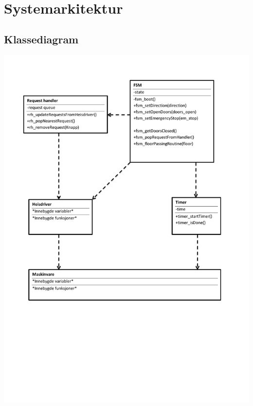 \documentclass[10pt,a4paper]{article}
\begin{document}
\section{Systemarkitektur}
\subsection{Klassediagram}
\includegraphics[scale=0.75]{Klassediagram.pdf}
\end{document}
